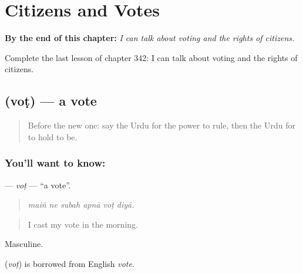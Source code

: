 
\chapter{Citizens and Votes}
\label{ch:ur-citizens-and-votes}

\begin{chapteropening}
\textbf{By the end of this chapter:} \emph{I can talk about voting and the rights of citizens.}

Complete the last lesson of chapter 342: I can talk about voting and the rights of citizens.
\end{chapteropening}

\section[\texorpdfstring{\ur{ووٹ} (voṭ)}{ووٹ (voṭ)}]{ (voṭ) — a vote}

\label{lesson:UR-C342-vot}



\begin{quote}
Before the new one: say the Urdu for the power to rule, then the Urdu for to hold to be.
\end{quote}

\subsection*{You'll want to know: }
\textbf{} — \emph{voṭ} — \textquotedblleft{}a vote\textquotedblright{}.

\begin{quote}
     
\end{quote}

\begin{quote}
\emph{maiṅ ne subah apnā voṭ diyā.}
\end{quote}

\begin{quote}
I cast my vote in the morning.
\end{quote}

Masculine.

\begin{cousinweb}
\textbf{} (\emph{voṭ}) is borrowed from English \emph{vote}.
\end{cousinweb}

